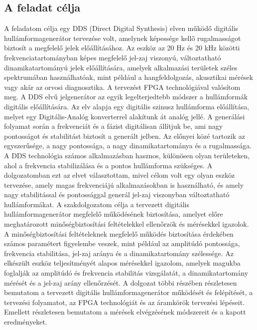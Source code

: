 \documentclass[a4paper,12pt]{article}
\begin{document}
		\subsection{A feladat célja}
		A feladatom célja egy DDS (Direct Digital Synthesis) elven működő digitális hullámformagenerátor tervezése volt, amelynek képessége kellő rugalmasságot biztosít a megfelelő jelek előállításához. Az eszköz az 20 Hz és 20 kHz közötti frekvenciatartományban képes megfelelő jel-zaj viszonyú, változtatható dinamikatartományú jelek előállítására, amelyek alkalmazási területek széles spektrumában használhatóak, mint például a hangfeldolgozás, akusztikai mérések vagy akár az orvosi diagnosztika. A tervezést FPGA technológiával valósítom meg.
		A DDS elvű jelgenerátor az egyik legelterjedtebb módszer a hullámformák digitális előállítására. Az elv alapja egy digitális szinusz hullámforma előállítása, melyet egy Digitális-Analóg konverterrel alakítunk át analóg jellé. A generálási folyamat során a frekvenciát és a fázist digitálisan állítjuk be, ami nagy pontosságot és stabilitást biztosít a generált jelben. Az előnyei közé tartozik az egyszerűsége, a nagy pontossága, a nagy dinamikatartománya és a rugalmassága. A DDS technológia számos alkalmazásban hasznos, különösen olyan területeken, ahol a frekvencia stabilizálása és a pontos hullámforma szükséges. A dolgozatomban ezt az elvet választottam, mivel célom volt egy olyan eszköz tervezése, amely magas frekvenciájú alkalmazásokban is használható, és amely nagy stabilitással és pontossággal generál jel-zaj viszonyban változtatható hullámformákat.
		A szakdolgozatom célja a tervezett digitális hullámformagenerátor megfelelő működésének biztosítása, amelyet előre meghatározott minőségbiztosítási feltételekkel ellenőrzök és mérésekkel igazolok. A minőségbiztosítási feltételeknek megfelelő működés biztosítása érdekében számos paramétert figyelembe veszek, mint például az amplitúdó pontossága, frekvencia stabilitása, jel-zaj aránya és a dinamikatartomány szélessége. Az elkészült eszköz teljesítményét alapos mérésekkel igazolom, amelyek magukba foglalják az amplitúdó és frekvencia stabilitás vizsgálatát, a dinamikatartomány mérését és a jel-zaj arány ellenőrzését.
		A dolgozat többi részében részletesen bemutatom a tervezett digitális hullámformagenerátor működését és felépítését, a tervezési folyamatot, az FPGA technológiát és az áramkörök tervezési lépéseit. Emellett részletesen bemutatom a mérések elvégzésének módszereit és a kapott eredményeket.
	
			
\end{document}
